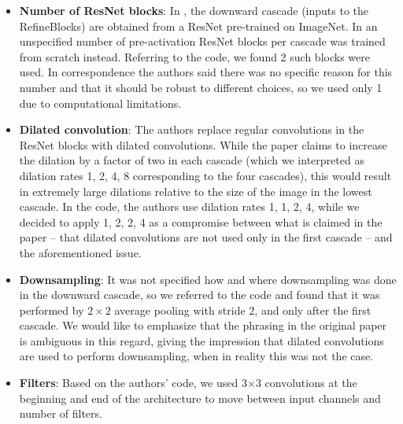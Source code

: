 \begin{itemize}
    \item \textbf{Number of ResNet blocks}: In \cite{refinenet}, the downward cascade (inputs to the RefineBlocks) are obtained from %
    a ResNet pre-trained on ImageNet. In \cite{ncsn-paper} an unspecified number of pre-activation ResNet blocks per cascade was trained from scratch instead. Referring to the code, we found 2 such blocks were used. In correspondence the authors said there was no specific reason for this number and that it should be robust to different choices, so we used only 1 due to computational limitations. 
    \item \textbf{Dilated convolution}: The authors replace regular convolutions in the ResNet blocks with dilated convolutions. While the paper claims to increase the dilation by a factor of two in each cascade (which we interpreted as dilation rates 1, 2, 4, 8 corresponding to the four cascades), this would result in extremely large dilations relative to the size of the image in the lowest cascade. In the code, the authors use dilation rates 1, 1, 2, 4, while we decided to apply 1, 2, 2, 4 as a compromise between what is claimed in the paper -- that dilated convolutions are not used only in the first cascade -- and the aforementioned issue. %
    \item \textbf{Downsampling}: It was not specified how and where downsampling was done in the downward cascade, so we referred to the code and found that it was performed by $2\times 2$ average pooling with stride 2, and only after the first cascade. We would like to emphasize that the phrasing in the original paper is ambiguous in this regard, giving the impression that dilated convolutions are used to perform downsampling, when in reality this was not the case.
    \item \textbf{Filters}: Based on the authors' code, we used 3$\times$3  convolutions at the beginning and end of the architecture to move between input channels and number of filters. 
    

\end{itemize}
